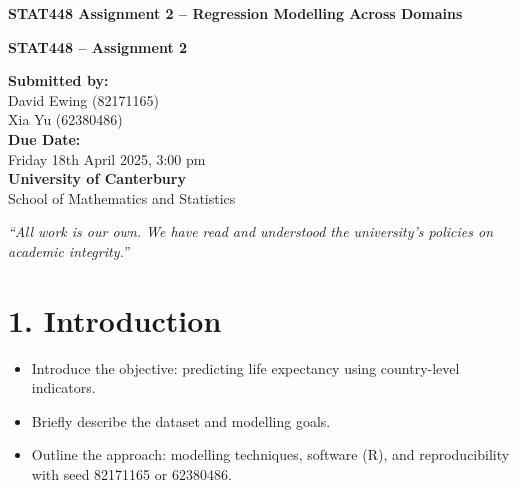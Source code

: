 \documentclass[11pt,a4paper]{article}
\begin{document}
\begin{titlepage}
    \centreing
    \vspace*{3cm}
    
    {\Huge\bfseries STAT448 Assignment 2 -- Regression Modelling Across Domains\par}
    \vspace{1.5cm}
    
    {\Large\bfseries STAT448 – Assignment 2\par}
    \vspace{2cm}
    
    \begin{flushleft}
        \textbf{Submitted by:}\\
        David Ewing (82171165)\\
        Xia Yu (62380486)\\[1.5cm]

        \textbf{Due Date:}\\
        Friday 18th April 2025, 3:00 pm\\[1.5cm]

        \textbf{University of Canterbury}\\
        School of Mathematics and Statistics\\[1cm]
    \end{flushleft}

    \vfill
    \begin{flushright}
        \textit{“All work is our own. We have read and understood the university's policies on academic integrity.”}
    \end{flushright}
\end{titlepage}

\onehalfspacing


\section*{1. Introduction}
\begin{itemize}
    \item Introduce the objective: predicting life expectancy using country-level indicators.
    \item Briefly describe the dataset and modelling goals.
    \item Outline the approach: modelling techniques, software (R), and reproducibility with seed 82171165 or 62380486.
\end{itemize}
\end{document}
